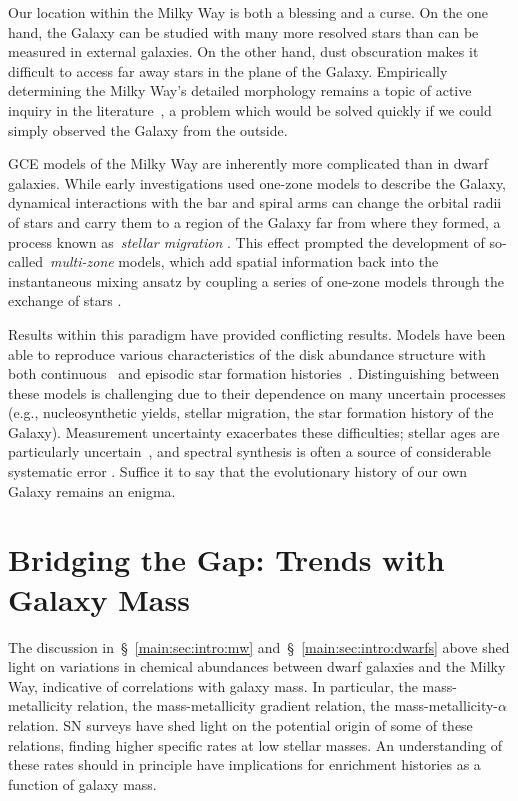 \documentclass[main.tex]{subfiles}
\begin{document}
\begin{doublespace}
Our location within the Milky Way is both a blessing and a curse.
On the one hand, the Galaxy can be studied with many more resolved stars than
can be measured in external galaxies.
On the other hand, dust obscuration makes it difficult to access far away stars
in the plane of the Galaxy.
Empirically determining the Milky Way's detailed morphology remains a topic of
active inquiry in the literature~\citep[e.g.,][]{Nataf2013, Bovy2019,
Shen2020}, a problem which would be solved quickly if we could simply observed
the Galaxy from the outside.
\par
GCE models of the Milky Way are inherently more complicated than in dwarf
galaxies.
While early investigations used one-zone models to describe the Galaxy,
dynamical interactions with the bar and spiral arms can change the orbital
radii of stars and carry them to a region of the Galaxy far from where they
formed, a process known as~\textit{stellar migration}
\citep[e.g.,][]{Sellwood2002, Schoenrich2009a}.
This effect prompted the development of so-called~\textit{multi-zone} models,
which add spatial information back into the instantaneous mixing ansatz by
coupling a series of one-zone models through the exchange of stars
\citep[e.g.,][]{Matteucci1989, Wyse1989, Prantzos1995}.
\par
Results within this paradigm have provided conflicting results.
Models have been able to reproduce various characteristics of the disk abundance
structure with both continuous~\citep[e.g.,][]{Chen2023} and episodic star
formation histories~\citep[e.g.,][]{Spitoni2021}.
Distinguishing between these models is challenging due to their dependence on
many uncertain processes (e.g., nucleosynthetic yields, stellar migration, the
star formation history of the Galaxy).
Measurement uncertainty exacerbates these difficulties; stellar ages are
particularly uncertain~\citep[e.g.,][]{Soderblom2010, Chaplin2013}, and
spectral synthesis is often a source of considerable systematic error
\citep[e.g.,][]{Joensson2018, Eilers2022}.
Suffice it to say that the evolutionary history of our own Galaxy remains an
enigma.

\section{Bridging the Gap: Trends with Galaxy Mass}
\label{main:sec:inro:snrates}

The discussion in~\S~\ref{main:sec:intro:mw} and~\S~\ref{main:sec:intro:dwarfs}
above shed light on variations in chemical abundances between dwarf galaxies
and the Milky Way, indicative of correlations with galaxy mass.
In particular, the mass-metallicity relation, the mass-metallicity gradient
relation, the mass-metallicity-$\alpha$ relation.
SN surveys have shed light on the potential origin of some of these relations,
finding higher specific rates at low stellar masses.
An understanding of these rates should in principle have implications for
enrichment histories as a function of galaxy mass.


\end{doublespace}
\end{document}
